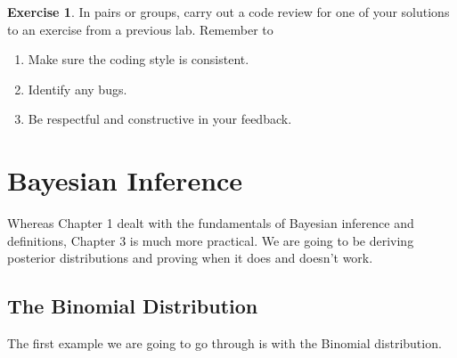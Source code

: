 \documentclass[
]{book}
\providecommand{\tightlist}{%
  \setlength{\itemsep}{0pt}\setlength{\parskip}{0pt}}
\theoremstyle{definition}
\theoremstyle{definition}
\theoremstyle{definition}
\newtheorem{exercise}{Exercise}[chapter]
\theoremstyle{definition}
\theoremstyle{remark}
\begin{document}
\begin{exercise}

In pairs or groups, carry out a code review for one of your solutions to an exercise from a previous lab. Remember to

\begin{enumerate}
\def\labelenumi{\arabic{enumi}.}
\tightlist
\item
  Make sure the coding style is consistent.
\item
  Identify any bugs.
\item
  Be respectful and constructive in your feedback.
\end{enumerate}

\end{exercise}

\hypertarget{bayesian-inference}{%
\chapter{Bayesian Inference}\label{bayesian-inference}}

Whereas Chapter 1 dealt with the fundamentals of Bayesian inference and definitions, Chapter 3 is much more practical. We are going to be deriving posterior distributions and proving when it does and doesn't work.

\hypertarget{the-binomial-distribution}{%
\section{The Binomial Distribution}\label{the-binomial-distribution}}

The first example we are going to go through is with the Binomial distribution.
\end{document}

